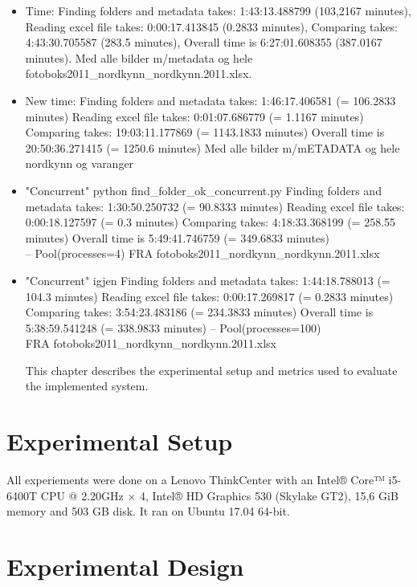 \documentclass[USenglish]{uit-thesis}
\begin{document}
\begin{itemize}

\item Time: Finding folders and metadata takes:  1:43:13.488799 (103,2167 minutes),
Reading excel file takes:  0:00:17.413845 (0.2833 minutes),
Comparing takes:  4:43:30.705587 (283.5 minutes),
Overall time is  6:27:01.608355 (387.0167 minutes).
Med alle bilder m/metadata og hele fotoboks2011\_nordkynn\_nordkynn.2011.xlsx.

\item New time: Finding folders and metadata takes:  1:46:17.406581 (= 106.2833 minutes)
Reading excel file takes:  0:01:07.686779 (= 1.1167 minutes)
Comparing takes:  19:03:11.177869 (= 1143.1833 minutes)
Overall time is  20:50:36.271415 (= 1250.6 minutes)
Med alle bilder m/mETADATA og hele nordkynn og varanger

\item "Concurrent" python find\_folder\_ok\_concurrent.py 
Finding folders and metadata takes:  1:30:50.250732 (= 90.8333 minutes)
Reading excel file takes:  0:00:18.127597 (= 0.3 minutes)
Comparing takes:  4:18:33.368199 (= 258.55 minutes)
Overall time is  5:49:41.746759 (= 349.6833 minutes)
\\ -- Pool(processes=4)
FRA fotoboks2011\_nordkynn\_nordkynn.2011.xlsx

\item "Concurrent" igjen
Finding folders and metadata takes:  1:44:18.788013 (= 104.3 minutes)
Reading excel file takes:  0:00:17.269817 (= 0.2833 minutes)
Comparing takes:  3:54:23.483186 (= 234.3833 minutes)
Overall time is  5:38:59.541248 (= 338.9833 minutes)
-- Pool(processes=100)
\\ FRA fotoboks2011\_nordkynn\_nordkynn.2011.xlsx

This chapter describes the experimental setup and metrics used to evaluate the implemented system. 

\end{itemize}
\section{Experimental Setup}
All experiements were done on a Lenovo ThinkCenter with an Intel® Core™ i5-6400T CPU @ 2.20GHz × 4, Intel® HD Graphics 530 (Skylake GT2), 15,6 GiB memory and 503 GB disk. It ran on Ubuntu 17.04 64-bit.

\section{Experimental Design}
\end{document}
